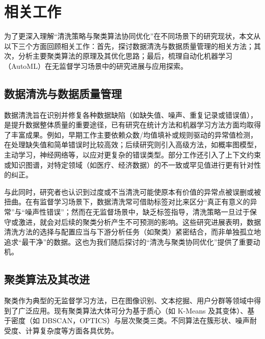 \documentclass[10pt]{article} %
\numberwithin{equation}{section}
\begin{document}
\section{相关工作}\label{sec:related_work}

为了更深入理解“清洗策略与聚类算法协同优化”在不同场景下的研究现状，本文从以下三个方面回顾相关工作：首先，探讨数据清洗与数据质量管理的相关方法；其次，分析主要聚类算法的原理及其优化思路；最后，梳理自动化机器学习（AutoML）在无监督学习场景中的研究进展与应用探索。

\subsection{数据清洗与数据质量管理}
数据清洗旨在识别并修复各种数据缺陷（如缺失值、噪声、重复记录或错误值），是提升数据整体质量的重要途径，已有研究在统计方法和机器学习方法方面均取得了丰富成果。例如，早期工作主要依赖众数/均值填补\cite{10.1093/bioinformatics/btr597}或规则驱动的异常值检测\cite{6544854, 5767833}，在处理缺失值和简单错误时比较高效；后续研究则引入高级方法，如概率图模型\cite{9151362}，主动学习\cite{10.14778/2994509.2994514, 10.1145/3357384.3358129}，神经网络\cite{Krishnan2017}等，以应对更复杂的错误类型。部分工作还引入了上下文约束或知识图谱\cite{6544847,10.14778/3407790.3407801}，对特定领域（如医疗、经济数据）的不一致或罕见值进行更有针对性的纠正。

与此同时，研究者也认识到过度或不当清洗可能使原本有价值的异常点被误删或被扭曲\cite{Ni2023}。在有监督学习场景下，数据清洗常可借助标签对比来区分“真正有意义的异常”与“噪声性错误”\cite{Bernhardt2022}；然而在无监督场景中，缺乏标签指导，清洗策略一旦过于保守或激进，就会对后续的聚类分析产生不可预测的影响。这些研究进展表明，数据清洗方法的选择与配置应当与下游分析任务（如聚类）紧密结合，而非单独孤立地追求“最干净”的数据\cite{Hu2017}。这也为我们随后探讨的“清洗与聚类协同优化”提供了重要动机。

\subsection{聚类算法及其改进}
聚类作为典型的无监督学习方法，已在图像识别、文本挖掘、用户分群等领域中得到了广泛应用。现有聚类算法大体可分为基于质心（如 K-Means 及其变体\cite{Bandyapadhyay2024, HUANG2021107996, IKOTUN2023178}）、基于密度（如 DBSCAN\cite{Abdulhameed2024, CHENG2024120731}，OPTICS\cite{HAJIHOSSEINLOU2024126094, 10.3233/IDA-205497, KAMIL20232625}）与层次聚类\cite{CHEN2025125714}三类。不同算法在簇形状、噪声耐受度、计算复杂度等方面各具优势\cite{SINGH2024102799}。
\end{document}
